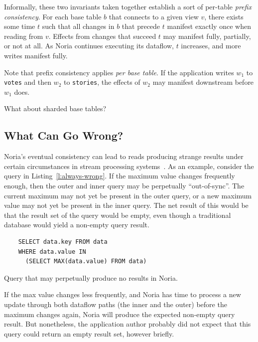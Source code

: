 Informally, these two invariants taken together establish a sort of per-table
\emph{prefix consistency}. For each base table $b$ that connects to a given view
$v$, there exists some time $t$ such that all changes in $b$ that precede $t$
manifest exactly once when reading from $v$. Effects from changes that succeed
$t$ may manifest fully, partially, or not at all. As Noria continues executing
its dataflow, $t$ increases, and more writes manifest fully.

Note that prefix consistency applies \emph{per base table}. If the application
writes $w_1$ to \texttt{votes} and then $w_2$ to \texttt{stories}, the effects
of $w_2$ may manifest downstream before $w_1$ does.

\begin{inprogress}
  What about sharded base tables?
\end{inprogress}

\subsection{What Can Go Wrong?}

Noria's eventual consistency can lead to reads producing strange results
under certain circumstances in stream processing
systems~\cite{materialize-eventual}. As an example, consider the query in
Listing~\vref{l:always-wrong}. If the maximum value changes frequently enough,
then the outer and inner query may be perpetually ``out-of-sync''. The current
maximum may not yet be present in the outer query, or a new maximum value may
not yet be present in the inner query. The net result of this would be that the
result set of the query would be empty, even though a traditional database would
yield a non-empty query result.

\begin{listing}[h]
  \begin{verbatim}
    SELECT data.key FROM data
    WHERE data.value IN
      (SELECT MAX(data.value) FROM data)
  \end{verbatim}
  \caption{Query that may perpetually produce no results in Noria.}
  \label{l:always-wrong}
\end{listing}

If the max value changes less frequently, and Noria has time to process a new
update through both dataflow paths (the inner and the outer) before the maximum
changes again, Noria will produce the expected non-empty query result. But
nonetheless, the application author probably did not expect that this query
could return an empty result set, however briefly.

